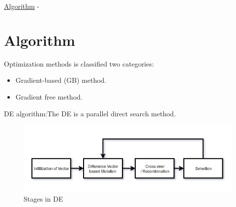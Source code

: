 \begin{frame}[allowframebreaks]{\underline{Algorithm} -}
    \section{Algorithm}
\parbox{0.65\linewidth}{ 
Optimization methods is classified two categories:
\begin{itemize}
\item Gradient-based (GB) method.
\item Gradient free method.
\end{itemize}

DE algorithm:The DE is a parallel direct search method.

\begin{figure}
    \begin{center}
    \includegraphics[scale=0.25]{figures/DE_stages.png}
    \caption{Stages in DE}
    \label{DE_stages}
    \end{center}
\end{figure}

\begin{itemize}


\end{itemize}}
\end{frame}

